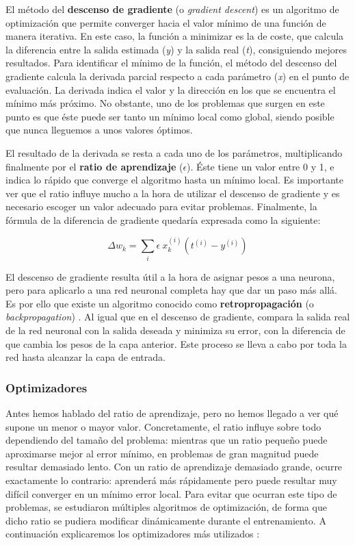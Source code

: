 El método del \textbf{descenso de gradiente} (o \textit{gradient descent}) \citep{Buduma:grad-dec} es un algoritmo de optimización que permite converger hacia el valor mínimo de una función de manera iterativa. En este caso, la función a minimizar es la de coste, que calcula la diferencia entre la salida estimada (\textit{y}) y la salida real (\textit{t}), consiguiendo mejores resultados. Para identificar el mínimo de la función, el método del descenso del gradiente calcula la derivada parcial respecto a cada parámetro (\textit{x}) en el punto de evaluación. La derivada indica el valor y la dirección en los que se encuentra el mínimo más próximo. No obstante, uno de los problemas que surgen en este punto es que éste puede ser tanto un mínimo local como global, siendo posible que nunca lleguemos a unos valores óptimos.

El resultado de la derivada se resta a cada uno de los parámetros, multiplicando finalmente por el \textbf{ratio de aprendizaje} ($\epsilon$). Éste tiene un valor entre 0 y 1, e indica lo rápido que converge el algoritmo hasta un mínimo local. Es importante ver que el ratio influye mucho a la hora de utilizar el descenso de gradiente y es necesario escoger un valor adecuado para evitar problemas. Finalmente, la fórmula de la diferencia de gradiente quedaría expresada como la siguiente:

$$\Delta w_{k} = \sum_{i} \epsilon\ x_{k}^{(i)} (t^{(i)} - y^{(i)} )$$

El descenso de gradiente resulta útil a la hora de asignar pesos a una neurona, pero para aplicarlo a una red neuronal completa hay que dar un paso más allá. Es por ello que existe un algoritmo conocido como \textbf{retropropagación} (o \textit{backpropagation}) \citep{Buduma:backprop}. Al igual que en el descenso de gradiente, compara la salida real de la red neuronal con la salida deseada y minimiza su error, con la diferencia de que cambia los pesos de la capa anterior. Este proceso se lleva a cabo por toda la red hasta alcanzar la capa de entrada.

\subsubsection{Optimizadores}
Antes hemos hablado del ratio de aprendizaje, pero no hemos llegado a ver qué supone un menor o mayor valor. Concretamente, el ratio influye sobre todo dependiendo del tamaño del problema: mientras que un ratio pequeño puede aproximarse mejor al error mínimo, en problemas de gran magnitud puede resultar demasiado lento. Con un ratio de aprendizaje demasiado grande, ocurre exactamente lo contrario: aprenderá más rápidamente pero puede resultar muy difícil converger en un mínimo error local. 
Para evitar que ocurran este tipo de problemas, se estudiaron múltiples algoritmos de optimización, de forma que dicho ratio se pudiera modificar dinámicamente durante el entrenamiento. A continuación explicaremos los optimizadores más utilizados \citep{NIPS2017_7003}:

